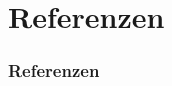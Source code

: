 \documentclass{beamer}
\title          {}
\author         {}
\institute      {}
\date           {}
\begin{document}
\begin{frame}
	\maketitle
\end{frame}

\section{}
\begin{frame}
	\frametitle{}

\end{frame}

\section{Referenzen}
\begin{frame}
	\frametitle{Referenzen}
	\printbibliography
\end{frame}
\end{document}
